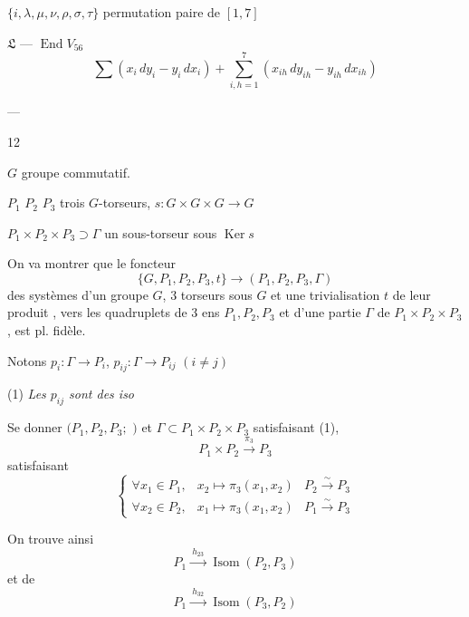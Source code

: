 \documentclass[11pt,a4paper]{article}
\begin{document}
$\lbrace i, \lambda, \mu, \nu, \rho, \sigma, \tau \rbrace$ permutation paire de $[1, 7]$

$\mathfrak{L}$ — $\operatorname{End} V_{56}$ \qquad
\[
\sum (x_i\, dy_i - y_i\, dx_i) + \sum_{i,h=1}^{7} (x_{ih}\, dy_{ih} - y_{ih}\, dx_{ih})
\]

 —

12

$G$ groupe commutatif.

$P_1$ $P_2$ $P_3$ trois $G$-torseurs, $s : G \times G \times G \to G$

$P_1 \times P_2 \times P_3 \supset \Gamma$ un sous-torseur sous $\operatorname{Ker} s$


On va montrer que le foncteur
\[
\lbrace G, P_1, P_2, P_3, t \rbrace \longrightarrow (P_1, P_2, P_3, \Gamma)
\]
 des systèmes d'un groupe $G$, 3 torseurs
  sous $G$ et une trivialisation $t$ de leur produit
, vers les quadruplets de 3 ens $P_1, P_2, P_3$ et d'une
partie $\Gamma$ de $P_1 \times P_2 \times P_3$, est pl. fidèle.

Notons $p_i : \Gamma \to P_i$, $p_{ij} : \Gamma \to P_{ij}$ $(i \neq j)$

(1) \emph{Les $p_{ij}$ sont des iso}

Se donner $(P_1, P_2, P_3;$ \struck{\ill{}}$)$ et $\Gamma \subset P_1 \times P_2 \times P_3$
satisfaisant (1), 
\[
P_1 \times P_2 \xrightarrow{\ \pi_3\ } P_3
\]
satisfaisant
\[
\left\lbrace
\begin{array}{lll}
\forall x_1 \in P_1, & x_2 \mapsto \pi_3(x_1, x_2) & P_2 \xrightarrow{\sim} P_3 \\
\forall x_2 \in P_2, & x_1 \mapsto \pi_3(x_1, x_2) & P_1 \xrightarrow{\sim} P_3
\end{array}
\right.
\]

On trouve ainsi
\[
P_1 \xrightarrow{\ h_{23}\ } \operatorname{Isom}(P_2, P_3)
\]
et de
\[
P_1 \xrightarrow{\ h_{32}\ } \operatorname{Isom}(P_3, P_2)
\]
\end{document}
